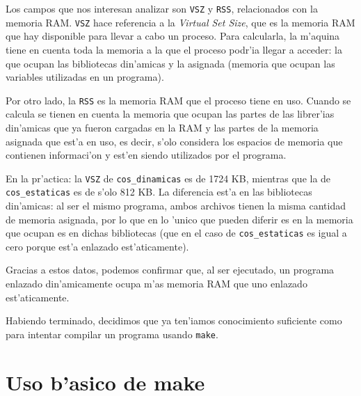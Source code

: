 \documentclass[11pt]{article}
\begin{document}
		Los campos que nos interesan analizar son \texttt{VSZ} y \texttt{RSS}, relacionados con la memoria RAM. \texttt{VSZ} hace referencia a la \textit{Virtual Set Size}, que es la memoria RAM que hay disponible para llevar a cabo un proceso. Para calcularla, la m'aquina tiene en cuenta toda la memoria a la que el proceso podr'ia llegar a acceder: la que ocupan las bibliotecas din'amicas y la asignada (memoria que ocupan las variables utilizadas en un programa). \\ %

		\centerline{} \vspace{2pt}

		Por otro lado, la \texttt{RSS} es la memoria RAM que el proceso tiene en uso. Cuando se calcula se tienen en cuenta la memoria que ocupan las partes de las librer'ias din'amicas que ya fueron cargadas en la RAM y las partes de la memoria asignada que est'a en uso, es decir, s'olo considera los espacios de memoria que contienen informaci'on y est'en siendo utilizados por el programa. \\ %

		\centerline{} \vspace{2pt}

		En la pr'actica: la \texttt{VSZ} de \texttt{cos\_dinamicas} es de 1724 KB, mientras que la de \texttt{cos\_estaticas} es de s'olo 812 KB.
		La diferencia est'a en las bibliotecas din'amicas: al ser el mismo programa, ambos archivos tienen la misma cantidad de memoria asignada, por lo que en lo 'unico que pueden diferir es en la memoria que ocupan es en dichas bibliotecas (que en el caso de \texttt{cos\_estaticas} es igual a cero porque est'a enlazado est'aticamente).  

		Gracias a estos datos, podemos confirmar que, al ser ejecutado, un programa enlazado din'amicamente ocupa m'as memoria RAM que uno enlazado est'aticamente.

		Habiendo terminado, decidimos que ya ten'iamos conocimiento suficiente como para intentar compilar un programa usando \texttt{make}.

		
	\section{Uso b'asico de make}
\end{document}

